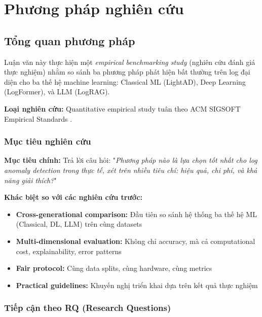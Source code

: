 \chapter{Phương pháp nghiên cứu}
\label{chap:methodology}


\section{Tổng quan phương pháp}
\label{sec:methodology-overview}

Luận văn này thực hiện một \textit{empirical benchmarking study} (nghiên cứu đánh giá thực nghiệm) nhằm so sánh ba phương pháp phát hiện bất thường trên log đại diện cho ba thế hệ machine learning: Classical ML (LightAD), Deep Learning (LogFormer), và LLM (LogRAG). 

\textbf{Loại nghiên cứu:} Quantitative empirical study tuân theo ACM SIGSOFT Empirical Standards \cite{acm_empirical_standards}.

\subsection{Mục tiêu nghiên cứu}
\label{subsec:research-goals}

\textbf{Mục tiêu chính:} Trả lời câu hỏi: "\textit{Phương pháp nào là lựa chọn tốt nhất cho log anomaly detection trong thực tế, xét trên nhiều tiêu chí: hiệu quả, chi phí, và khả năng giải thích?}"

\textbf{Khác biệt so với các nghiên cứu trước:}
\begin{itemize}
    \item \textbf{Cross-generational comparison:} Đầu tiên so sánh hệ thống ba thế hệ ML (Classical, DL, LLM) trên cùng datasets
    \item \textbf{Multi-dimensional evaluation:} Không chỉ accuracy, mà cả computational cost, explainability, error patterns
    \item \textbf{Fair protocol:} Cùng data splits, cùng hardware, cùng metrics
    \item \textbf{Practical guidelines:} Khuyến nghị triển khai dựa trên kết quả thực nghiệm
\end{itemize}

\subsection{Tiếp cận theo RQ (Research Questions)}
\label{subsec:rq-driven}

